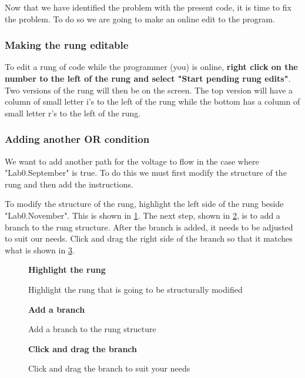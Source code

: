 Now that we have identified the problem with the present code, it is time to fix the problem. To do so we are going to make an online edit to the program.

\subsubsection{Making the rung editable}

To edit a rung of code while the programmer (you) is online, \textbf{right click on the number to the left of the rung and select "Start pending rung edits"}. Two versions of the rung will then be on the screen. The top version will have a column of small letter i's to the left of the rung while the bottom has a column of small letter r's to the left of the rung.

\subsubsection{Adding another OR condition}

We want to add another path for the voltage to flow in the case where "Lab0.September" is true. To do this we must first modify the structure of the rung and then add the instructions.

To modify the structure of the rung, highlight the left side of the rung beside "Lab0.November". This is shown in \figureautorefname \ref{fig:HighlightRung}. The next step, shown in \figureautorefname \ref{fig:AddBranch}, is to add a branch to the rung structure. After the branch is added, it needs to be adjusted to suit our needs. Click and drag the right side of the branch so that it matches what is shown in \figureautorefname \ref{fig:DragTheBranch}.

\begin{figure}[h]
\centering
\textbf{Highlight the rung}\par \medskip
{}
\caption{Highlight the rung that is going to be structurally modified}
\label{fig:HighlightRung}
\end{figure}


\begin{figure}[h]
\centering
\textbf{Add a branch}\par \medskip
{}
\caption{Add a branch to the rung structure}
\label{fig:AddBranch}
\end{figure}


\begin{figure}[h]
\centering
\textbf{Click and drag the branch}\par \medskip
{}
\caption{Click and drag the branch to suit your needs}
\label{fig:DragTheBranch}
\end{figure}


